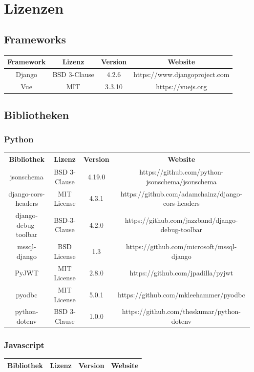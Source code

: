 \documentclass{article}
\begin{document}
\newpage

\section{Lizenzen}
\subsection{Frameworks}
\begin{center}
    \begin{tabular}{||c c c c||} 
     \hline
     Framework & Lizenz & Version & Website \\ [0.5ex] 
     \hline\hline
     Django & BSD 3-Clause & 4.2.6 & https://www.djangoproject.com \\ 
     \hline
     Vue & MIT & 3.3.10 & https://vuejs.org \\ [1ex] 
     \hline

    \end{tabular}
    \end{center}
\subsection{Bibliotheken}
\subsubsection{Python}
\begin{center}
    \begin{tabular}{||c c c c||} 
     \hline
     Bibliothek & Lizenz & Version & Website \\ [0.5ex] 
     \hline\hline
     jsonschema & BSD 3-Clause & 4.19.0 & https://github.com/python-jsonschema/jsonschema \\ 
      [1ex] 
     \hline
     django-cors-headers & MIT License & 4.3.1 & https://github.com/adamchainz/django-cors-headers \\
     [1ex]
     \hline
     django-debug-toolbar & BSD-3-Clause & 4.2.0 & https://github.com/jazzband/django-debug-toolbar \\
     [1ex]
     \hline
     mssql-django & BSD License & 1.3 & https://github.com/microsoft/mssql-django \\
     [1ex]
     \hline
     PyJWT & MIT License & 2.8.0 & https://github.com/jpadilla/pyjwt \\
     [1ex]
     \hline
     pyodbc & MIT License & 5.0.1 & https://github.com/mkleehammer/pyodbc \\
     [1ex]
     \hline
     python-dotenv & BSD 3-Clause & 1.0.0 & https://github.com/theskumar/python-dotenv \\
     [1ex]
     \hline
    \end{tabular}
    \end{center}
\subsubsection{Javascript}
\begin{center}
    \begin{tabular}{||c c c c||} 
     \hline
     Bibliothek & Lizenz & Version & Website \\ [0.5ex] 
     \hline\hline
     
    \end{tabular}
    \end{center}
\newpage


\end{document}
